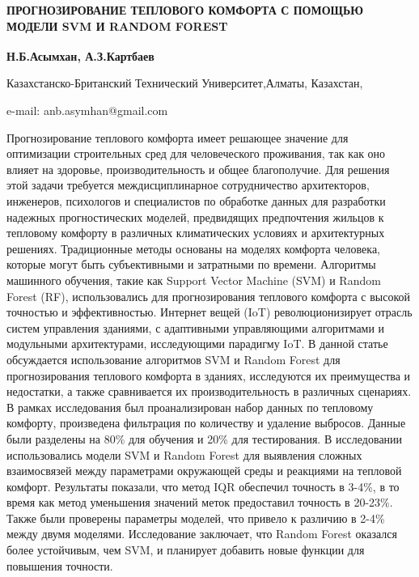 \begin{articleheader}
{\bfseries ПРОГНОЗИРОВАНИЕ ТЕПЛОВОГО КОМФОРТА С ПОМОЩЬЮ МОДЕЛИ SVM И RANDOM
FOREST}
\end{articleheader}

\begin{affiliation}
{\bfseries Н.Б.Асымхан\textsuperscript{\envelope }, А.З.Картбаев}

Казахстанско-Британский Технический Университет,Алматы, Казахстан,

e-mail: anb.asymhan@gmail.com
\end{affiliation}

Прогнозирование теплового комфорта имеет решающее значение для
оптимизации строительных сред для человеческого проживания, так как оно
влияет на здоровье, производительность и общее благополучие. Для решения
этой задачи требуется междисциплинарное сотрудничество архитекторов,
инженеров, психологов и специалистов по обработке данных для разработки
надежных прогностических моделей, предвидящих предпочтения жильцов к
тепловому комфорту в различных климатических условиях и архитектурных
решениях. Традиционные методы основаны на моделях комфорта человека,
которые могут быть субъективными и затратными по времени. Алгоритмы
машинного обучения, такие как Support Vector Machine (SVM) и Random
Forest (RF), использовались для прогнозирования теплового комфорта с
высокой точностью и эффективностью. Интернет вещей (IoT)
революционизирует отрасль систем управления зданиями, с адаптивными
управляющими алгоритмами и модульными архитектурами, исследующими
парадигму IoT. В данной статье обсуждается использование алгоритмов SVM
и Random Forest для прогнозирования теплового комфорта в зданиях,
исследуются их преимущества и недостатки, а также сравнивается их
производительность в различных сценариях. В рамках исследования был
проанализирован набор данных по тепловому комфорту, произведена
фильтрация по количеству и удаление выбросов. Данные были разделены на
80\% для обучения и 20\% для тестирования. В исследовании использовались
модели SVM и Random Forest для выявления сложных взаимосвязей между
параметрами окружающей среды и реакциями на тепловой комфорт. Результаты
показали, что метод IQR обеспечил точность в 3-4\%, в то время как метод
уменьшения значений меток предоставил точность в 20-23\%. Также были
проверены параметры моделей, что привело к различию в 2-4\% между двумя
моделями. Исследование заключает, что Random Forest оказался более
устойчивым, чем SVM, и планирует добавить новые функции для повышения
точности.

